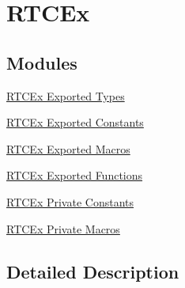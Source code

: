 \hypertarget{group___r_t_c_ex}{}\section{R\+T\+C\+Ex}
\label{group___r_t_c_ex}
\subsection*{Modules}
\begin{DoxyCompactItemize}
\item 
\hyperlink{group___r_t_c_ex___exported___types}{R\+T\+C\+Ex Exported Types}
\item 
\hyperlink{group___r_t_c_ex___exported___constants}{R\+T\+C\+Ex Exported Constants}
\item 
\hyperlink{group___r_t_c_ex___exported___macros}{R\+T\+C\+Ex Exported Macros}
\item 
\hyperlink{group___r_t_c_ex___exported___functions}{R\+T\+C\+Ex Exported Functions}
\item 
\hyperlink{group___r_t_c_ex___private___constants}{R\+T\+C\+Ex Private Constants}
\item 
\hyperlink{group___r_t_c_ex___private___macros}{R\+T\+C\+Ex Private Macros}
\end{DoxyCompactItemize}


\subsection{Detailed Description}
